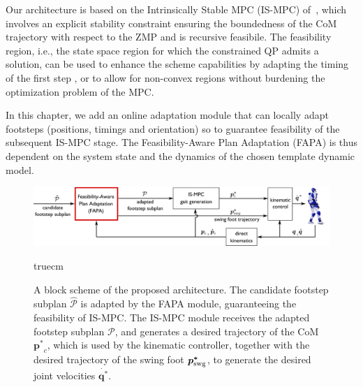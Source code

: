 

Our architecture is based on the Intrinsically Stable MPC (IS-MPC) of~\cite{ScDeLaOr:20}, which involves an explicit stability constraint ensuring the boundedness of the CoM trajectory with respect to the ZMP and is recursive feasibile. 
The feasibility region, i.e., the state space region for which the constrained QP admits a solution, can be used to enhance the scheme capabilities by adapting the timing of the first step \cite{Smaldone2021FeasibilityDrivenSTA}, or to allow for non-convex regions \cite{Habib2022HandlingNonConvex} without burdening the optimization problem of the MPC.

In this chapter, we add an online adaptation module that can locally adapt footsteps (positions, timings and orientation) so to guarantee feasibility of the subsequent IS-MPC stage. The Feasibility-Aware Plan Adaptation (FAPA) is thus dependent on the system state and the dynamics of the chosen template dynamic model.


\begin{figure}
\centering\includegraphics[width=\textwidth]{figures/BlockScheme-NLP-STA.pdf}
\caption{A block scheme of the proposed architecture. The candidate footstep subplan $\mathcal{\hat{P}}$ is adapted by the FAPA module, guaranteeing the feasibility of IS-MPC. The IS-MPC module receives the adapted footstep subplan $\mathcal{P}$, and generates a desired trajectory of the CoM $\bm{p^*}_c$, which is used by the kinematic controller, together with the desired trajectory of the swing foot $\bm{p^*}_{\rm swg}$, to generate the desired joint velocities $\dot{\bm{q^*}}$.}
\label{fig:FAPA:block_scheme}
 truecm
\end{figure}

